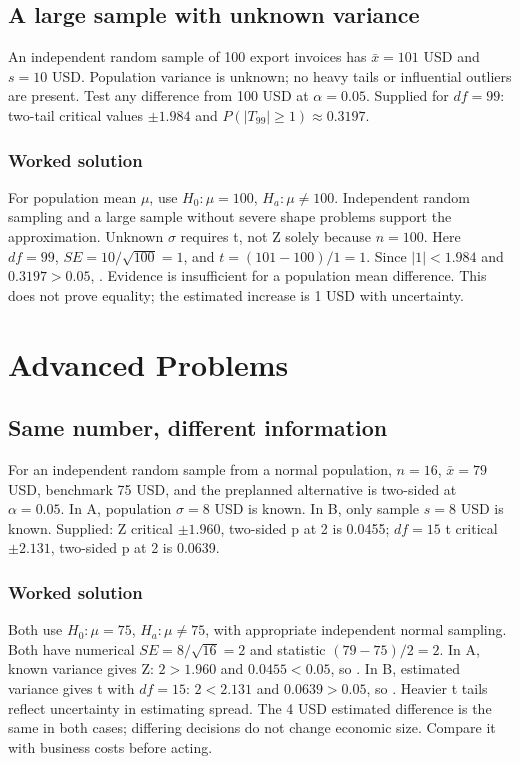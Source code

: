 \subsection{A large sample with unknown variance}\label{prob:large}
An independent random sample of 100 export invoices has $\bar x=101$ USD and $s=10$ USD. Population variance is unknown; no heavy tails or influential outliers are present. Test any difference from 100 USD at $\alpha=0.05$. Supplied for $df=99$: two-tail critical values $\pm1.984$ and $P(|T_{99}|\ge1)\approx0.3197$.
\subsubsection*{Worked solution}\label{sol:large}
For population mean $\mu$, use $H_0:\mu=100$, $H_a:\mu\ne100$. Independent random sampling and a large sample without severe shape problems support the approximation. Unknown $\sigma$ requires t, not Z solely because $n=100$. Here $df=99$, $SE=10/\sqrt{100}=1$, and $t=(101-100)/1=1$. Since $|1|<1.984$ and $0.3197>0.05$, . Evidence is insufficient for a population mean difference. This does not prove equality; the estimated increase is 1 USD with uncertainty.
\section{Advanced Problems}\label{sec:advanced}
\subsection{Same number, different information}\label{prob:compare}
For an independent random sample from a normal population, $n=16$, $\bar x=79$ USD, benchmark 75 USD, and the preplanned alternative is two-sided at $\alpha=0.05$. In A, population $\sigma=8$ USD is known. In B, only sample $s=8$ USD is known. Supplied: Z critical $\pm1.960$, two-sided p at 2 is 0.0455; $df=15$ t critical $\pm2.131$, two-sided p at 2 is 0.0639.
\subsubsection*{Worked solution}\label{sol:compare}
Both use $H_0:\mu=75$, $H_a:\mu\ne75$, with appropriate independent normal sampling. Both have numerical $SE=8/\sqrt{16}=2$ and statistic $(79-75)/2=2$. In A, known variance gives Z: $2>1.960$ and $0.0455<0.05$, so . In B, estimated variance gives t with $df=15$: $2<2.131$ and $0.0639>0.05$, so . Heavier t tails reflect uncertainty in estimating spread. The 4 USD estimated difference is the same in both cases; differing decisions do not change economic size. Compare it with business costs before acting.


